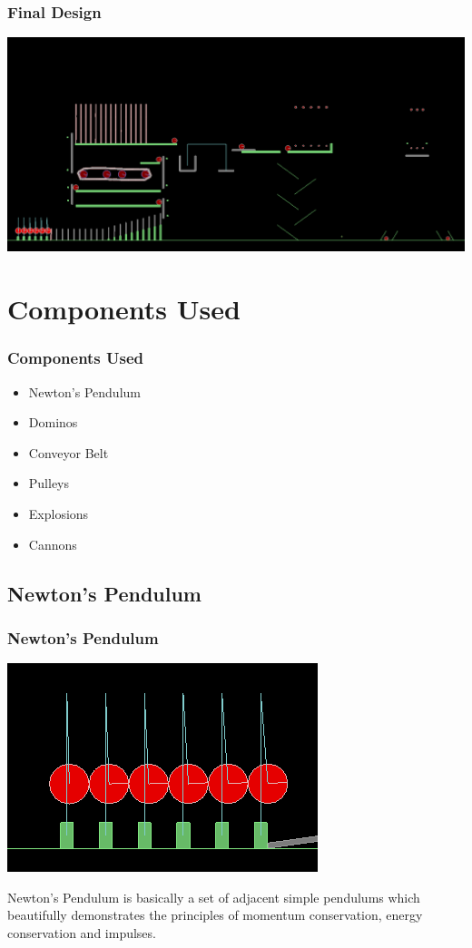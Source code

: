\begin{frame}
\frametitle{Final Design}
\begin{center}
\includegraphics[scale=0.27]{./Images/FinalDesign.png}
\end{center}
\end{frame}

\section{Components Used}
\begin{frame}
	\frametitle{Components Used}
\begin{itemize}
\item Newton's Pendulum
\item Dominos
\item Conveyor Belt
\item Pulleys
\item Explosions
\item Cannons
\end{itemize}
\end{frame}

\subsection{Newton's Pendulum}
\begin{frame}
  \frametitle{Newton's Pendulum}
  \begin{center}
\includegraphics[scale=.45]{./Images/NewtonsPendulum.png}
  \end{center}
Newton's Pendulum is basically a set of adjacent simple pendulums which  beautifully demonstrates the principles of momentum conservation, energy conservation and impulses.
\end{frame}


